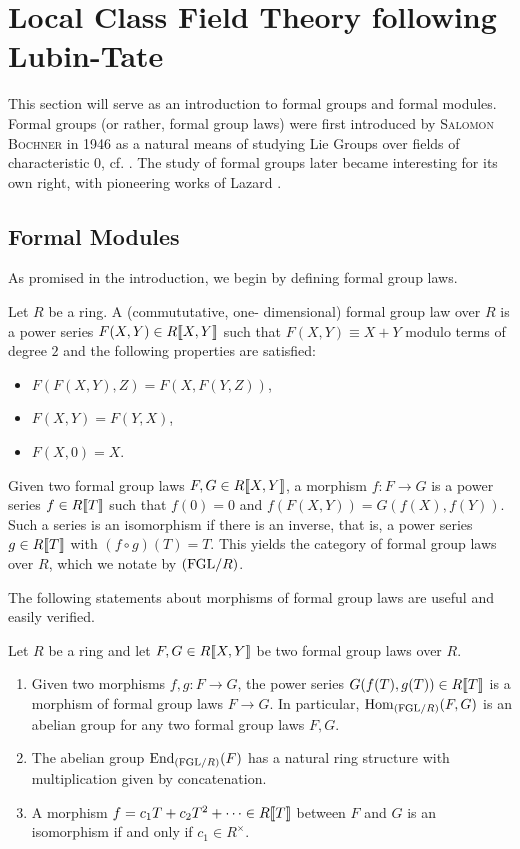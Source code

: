 \documentclass[../main.tex]{subfiles}
\begin{document}
\section{Local Class Field Theory following Lubin-Tate}

This section will serve as an introduction to formal groups and 
formal modules. Formal groups (or rather, formal group laws) were first
introduced by \textsc{Salomon Bochner} in 1946 as a natural means of studying Lie
Groups over fields of characteristic $0$, cf. \cite{Bochner1946FGrps}. 
The study of formal groups later became interesting for its own right, 
with pioneering works of Lazard \cite{Lazard1955FGrps}.

\subsection{Formal Modules} %
\label{sub:Formal Modules}
As promised in the introduction, we begin by defining {formal group
laws}.

\begin{defi}
    Let $R$ be a ring. A (commututative, one-\allowbreak
    dimen\-sional) formal group law over $R$ is a power series $F(X,Y) \in
    R\llbracket X, Y \rrbracket$ such that $F(X,Y) \equiv X + Y$ modulo terms
    of degree $2$ and
    the following properties are satisfied:
    \begin{itemize}
        \item $F(F(X,Y),Z) = F(X,F(Y,Z))$,
        \item $F(X,Y) = F(Y,X)$,
        \item $F(X,0) = X$.
    \end{itemize}
\end{defi}
Given two formal group laws $F, G \in R\llbracket X,Y\rrbracket$, a morphism
$f: F\to G$ is a 
power series $f \in R\llbracket T \rrbracket$ such that $f(0) = 0$ and $f(F(X,Y)) =
G(f(X),f(Y))$.
Such a series is an isomorphism if there is an {inverse}, that
is, a power series $g \in R\llbracket T \rrbracket$ with $(f \circ g)(T) = T$.
This yields the category of formal group laws over $R$, which we notate by
${(\mathrm{FGL}/{R})}$.

The following statements about morphisms of formal group laws are 
useful and easily verified.
\begin{lem}\label{lem:FGLeasyfacts}
  Let $R$ be a ring and let $F,G \in R\llbracket X,Y\rrbracket$ be two formal
  group laws over $R$. 
  \begin{enumerate}
    \item Given two morphisms $f,g : F \to G$, the power series $G(f(T), g(T))
      \in R\llbracket T \rrbracket$ is a morphism of formal group laws 
      $F \to G$. In particular, $\operatorname{Hom}_{(\mathrm{FGL}/{R})}(F,G)$ is an abelian
      group for any two formal group laws $F,G$.
    \item The abelian group $\operatorname{End}_{(\mathrm{FGL}/{R})}(F)$ has a natural ring structure
      with multiplication given by concatenation.
    \item A morphism $f = c_1 T + c_2 T^2 + \dots \in R\llbracket T \rrbracket$ between
      $F$ and $G$ is an isomorphism if and only if $c_1 \in R^\times$.
  \end{enumerate}
\end{lem}
\end{document}
